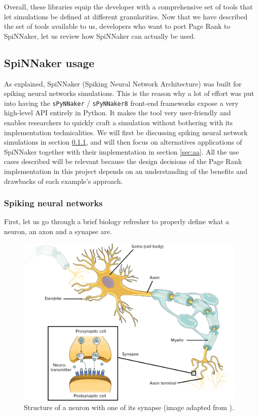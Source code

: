 Overall, these libraries equip the developer with a comprehensive set of tools that let simulations be defined at different granularities. Now that we have described the set of tools available to us, developers who want to port Page Rank to SpiNNaker, let us review how SpiNNaker can actually be used. \\

\subsection{SpiNNaker usage} \label{sec:usage}

As explained, SpiNNaker (Spiking Neural Network Architecture) was built for spiking neural networks simulations. This is the reason why a lot of effort was put into having the \texttt{sPyNNaker} / \texttt{sPyNNaker8} front-end frameworks expose a very high-level API entirely in Python. It makes the tool very user-friendly and enables researchers to quickly craft a simulation without bothering with its implementation technicalities. We will first be discussing spiking neural network simulations in section \ref{sec:snn}, and will then focus on alternatives applications of SpiNNaker together with their implementation in section \ref{sec:aa}. All the use cases described will be relevant because the design decisions of the Page Rank implementation in this project depends on an understanding of the benefits and drawbacks of each example's approach.

\newpage %
\subsubsection{Spiking neural networks} \label{sec:snn}

First, let us go through a brief biology refresher to properly define what a neuron, an axon and a synapse are.

\begin{figure}[hbtp]
\centering
\includegraphics[width = 1\hsize]{figures/neuron.png}
\caption{Structure of a neuron with one of its synapse (image adapted from \cite{neuron}).}
\label{fig:neuron}
\end{figure}

